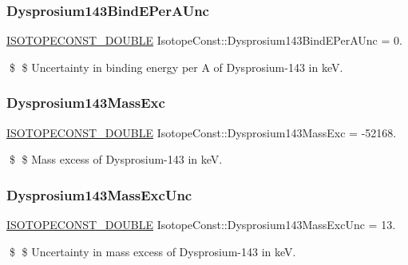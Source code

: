 \subsubsection{\texorpdfstring{Dysprosium143\+Bind\+E\+Per\+A\+Unc}{Dysprosium143BindEPerAUnc}}
{\footnotesize\ttfamily \mbox{\hyperlink{group___isotope_const-_macros_ga8f45a7272ce02c0b4c65c44636ed719a}{I\+S\+O\+T\+O\+P\+E\+C\+O\+N\+S\+T\+\_\+\+D\+O\+U\+B\+LE}} Isotope\+Const\+::\+Dysprosium143\+Bind\+E\+Per\+A\+Unc = 0.}

\$ \$ Uncertainty in binding energy per A of Dysprosium-\/143 in keV. \mbox{\label{group___isotope_const-_dysprosium-_dy143_ga883be184b5841c7bb8d86974a865f13a}} 
\subsubsection{\texorpdfstring{Dysprosium143\+Mass\+Exc}{Dysprosium143MassExc}}
{\footnotesize\ttfamily \mbox{\hyperlink{group___isotope_const-_macros_ga8f45a7272ce02c0b4c65c44636ed719a}{I\+S\+O\+T\+O\+P\+E\+C\+O\+N\+S\+T\+\_\+\+D\+O\+U\+B\+LE}} Isotope\+Const\+::\+Dysprosium143\+Mass\+Exc = -\/52168.}

\$ \$ Mass excess of Dysprosium-\/143 in keV. \mbox{\label{group___isotope_const-_dysprosium-_dy143_ga4bde7de71a232ca7027689e75c555e9b}} 
\subsubsection{\texorpdfstring{Dysprosium143\+Mass\+Exc\+Unc}{Dysprosium143MassExcUnc}}
{\footnotesize\ttfamily \mbox{\hyperlink{group___isotope_const-_macros_ga8f45a7272ce02c0b4c65c44636ed719a}{I\+S\+O\+T\+O\+P\+E\+C\+O\+N\+S\+T\+\_\+\+D\+O\+U\+B\+LE}} Isotope\+Const\+::\+Dysprosium143\+Mass\+Exc\+Unc = 13.}

\$ \$ Uncertainty in mass excess of Dysprosium-\/143 in keV. \mbox{\label{group___isotope_const-_dysprosium-_dy143_ga688977e35cd2c5ec750b75edefc77621}} 
